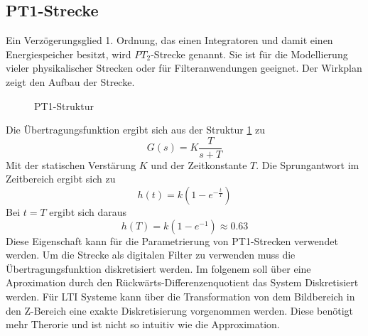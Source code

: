 \subsection{PT1-Strecke}
Ein Verzögerungsglied 1. Ordnung, das einen Integratoren und damit einen Energiespeicher besitzt, wird $PT_2$-Strecke genannt. Sie ist für die Modellierung vieler physikalischer Strecken oder für Filteranwendungen geeignet. Der Wirkplan zeigt den Aufbau der Strecke.
\begin{figure}[H]
\caption{PT1-Struktur}
\label{Grundlagen:PT1Struktur}
\end{figure}
Die Übertragungsfunktion ergibt sich aus der Struktur \ref{Grundlagen:PT1Struktur} zu
\begin{equation}
G(s) = K\frac{T}{s+T}
\end{equation}
Mit der statischen Verstärung $K$ und der Zeitkonstante $T$. Die Sprungantwort im Zeitbereich ergibt sich zu
\begin{equation}
h(t) = k(1-e^{-\frac{t}{T}})
\end{equation}
Bei $t=T$ ergibt sich daraus
\begin{equation}
h(T) = k(1-e^{-1}) \approx 0.63
\end{equation}
Diese Eigenschaft kann für die Parametrierung von PT1-Strecken verwendet werden. Um die Strecke als digitalen Filter zu verwenden muss die Übertragungsfunktion diskretisiert werden. Im folgenem soll über eine Aproximation durch den Rückwärts-Differenzenquotient das System Diskretisiert werden. Für LTI Systeme kann über die Transformation von dem Bildbereich in den Z-Bereich eine exakte Diskretisierung vorgenommen werden. Diese benötigt mehr Therorie und ist nicht so intuitiv wie die Approximation.
\cite[vgl.][S.501ff.]{Lunze2010}




